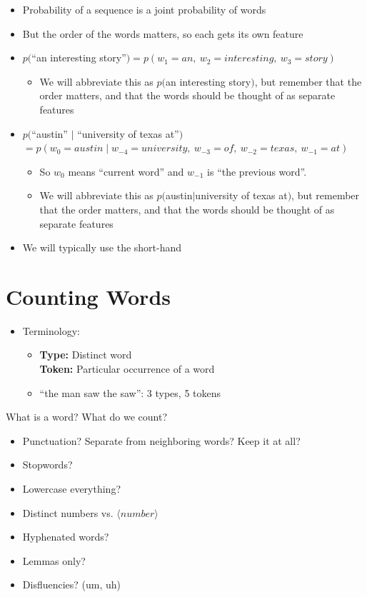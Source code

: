 \documentclass[11pt,letterpaper]{article}
\begin{document}
\begin{itemize}
  \item Probability of a sequence is a joint probability of words
  \item But the order of the words matters, so each gets its own feature
  \item $p($``an interesting story''$) = p(w_1=an, ~ w_2=interesting, ~ w_3=story)$
    \begin{itemize}
      \item We will abbreviate this as $p($an interesting story$)$, but remember that the order matters, and that the words should be thought of as separate features
    \end{itemize}
  \item $p($``austin'' $\mid$ ``university of texas at''$)$\\
        $= p(w_{0}=austin \mid w_{-4}=university, ~ w_{-3}=of, ~ w_{-2}=texas, ~ w_{-1}=at)$
    \begin{itemize}
      \item So $w_0$ means ``current word'' and $w_{-1}$ is ``the previous word''.
      \item We will abbreviate this as $p($austin$ \mid $university of texas at$)$, but remember that the order matters, and that the words should be thought of as separate features
    \end{itemize}
  \item We will typically use the short-hand
\end{itemize}


\section{Counting Words}

\begin{itemize}
  \item Terminology:
    \begin{itemize}
      \item \textbf{Type:} Distinct word \\
            \textbf{Token:} Particular occurrence of a word
      \item ``the man saw the saw'': 3 types, 5 tokens
    \end{itemize}
\end{itemize}

What is a word?  What do we count?

\begin{itemize}
  \item Punctuation?  Separate from neighboring words?  Keep it at all?
  \item Stopwords?
  \item Lowercase everything?
  \item Distinct numbers vs. $\langle number \rangle$
  \item Hyphenated words?
  \item Lemmas only?
  \item Disfluencies?  (um, uh)
\end{itemize}
\end{document}
